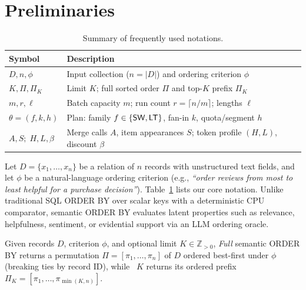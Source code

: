 \section{Preliminaries}
\label{sec:prelim}

\begin{table}[t]
  \centering\footnotesize
  \caption{Summary of frequently used notations.}
  \label{tab:notation}
  \setlength{\tabcolsep}{3pt}
  \begin{tabular*}{\columnwidth}{@{\extracolsep{\fill}}ll@{}}
    \toprule
    Symbol & Description \\
    \midrule
    $D, n, \phi$ & Input collection ($n=|D|$) and ordering criterion $\phi$ \\
    $K, \Pi, \Pi_K$ & Limit $K$; full sorted order $\Pi$ and top-$K$ prefix $\Pi_K$ \\
    $m, r, \boldsymbol{\ell}$ & Batch capacity $m$; run count $r=\lceil n/m\rceil$; lengths $\boldsymbol{\ell}$ \\
    $\theta=(f,k,h)$ & Plan: family $f\in\{{\mathsf{SW}}{},{\mathsf{LT}}{}\}$, fan-in $k$, quota/segment $h$ \\
    $A, S;\; H, L, \beta$ & Merge calls $A$, item appearances $S$; token profile $(H,L)$, discount $\beta$ \\
    \bottomrule
  \end{tabular*}
\end{table}

Let $D=\{x_1,\dots,x_n\}$ be a relation of $n$ records with unstructured text fields, and let $\phi$ be a natural-language ordering criterion (e.g., \emph{``order reviews from most to least helpful for a purchase decision''}). Table~\ref{tab:notation} lists our core notation. Unlike traditional SQL \textsf{ORDER BY} over scalar keys with a deterministic CPU comparator, semantic \textsf{ORDER BY} evaluates latent properties such as relevance, helpfulness, sentiment, or evidential support via an LLM ordering oracle.

\begin{definition}
\label{def:sem-orderby}
Given records $D$, criterion $\phi$, and optional limit $K \in \mathbb{Z}_{>0}$, \emph{Full} semantic \textsf{ORDER BY} returns a permutation $\Pi = [\pi_1, \dots, \pi_n]$ of $D$ ordered best-first under $\phi$ (breaking ties by record ID), while \LIMIT~$K$ returns its ordered prefix $\Pi_K = [\pi_1, \dots, \pi_{\min(K,n)}]$.
\end{definition}

